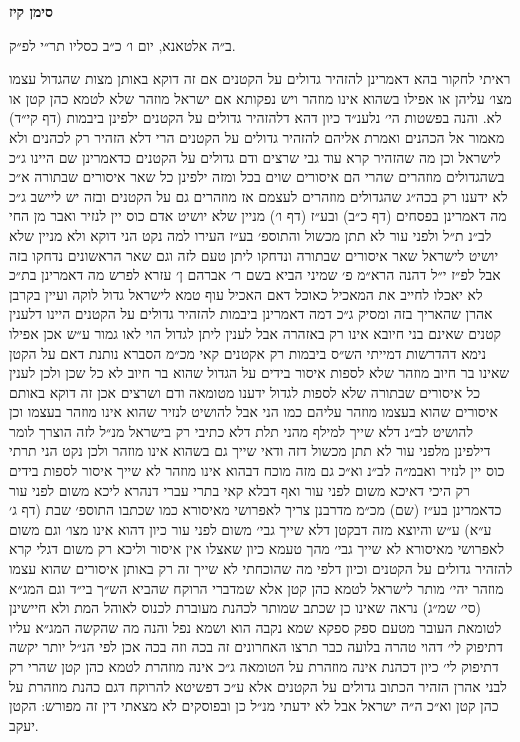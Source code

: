\documentclass[12pt, openany]{book}
\newcommand{\chapname}{}
\newcommand{\newchap}[1]{
	\addcontentsline{toc}{chapter}{#1}
	\renewcommand{\chapname}{#1}
		\begin{center}
			\textbf{%
\fontsize{16pt}{16pt}\selectfont
				#1}
		\end{center}
}
\begin{document}
\newchap{סימן קיז}
\begin{multicols}{2}
ב״ה אלטאנא, יום ו׳ כ״ב כסליו תר״י לפ״ק.\\\vspace{0pt}

ראיתי לחקור בהא דאמרינן להזהיר גדולים על הקטנים אם זה דוקא באותן מצות שהגדול עצמו מצו׳ עליהן או אפילו בשהוא אינו מוזהר ויש נפקותא אם ישראל מוזהר שלא לטמא כהן קטן או לא. והנה בפשטות הי׳ נלענ״ד כיון דהא דלהזהיר גדולים על הקטנים ילפינן ביבמות (דף קי״ד) מאמור אל הכהנים ואמרת אליהם להזהיר גדולים על הקטנים הרי דלא הזהיר רק לכהנים ולא לישראל וכן מה שהזהיר קרא עוד גבי שרצים ודם גדולים על הקטנים כדאמרינן שם היינו ג״כ בשהגדולים מוזהרים שהרי הם איסורים שוים בכל ומזה ילפינן כל שאר איסורים שבתורה א״כ לא ידענו רק בכה״ג שהגדולים מוזהרים לעצמם אז מוזהרים גם על הקטנים ובזה יש ליישב ג״כ מה דאמרינן בפסחים (דף כ״ב) ובע״ז (דף ו׳) מניין שלא יושיט אדם כוס יין לנזיר ואבר מן החי לב״נ ת״ל ולפני עור לא תתן מכשול והתוספ׳ בע״ז העירו למה נקט הני דוקא ולא מניין שלא יושיט לישראל שאר איסורים שבתורה ונדחקו ליתן טעם לזה וגם שאר הראשונים נדחקו בזה אבל לפ״ז י״ל דהנה הרא״מ פ׳ שמיני הביא בשם ר׳ אברהם ן׳ עזרא לפרש מה דאמרינן בת״כ לא יאכלו לחייב את המאכיל כאוכל דאם האכיל עוף טמא לישראל גדול לוקה ועיין בקרבן אהרן שהאריך בזה ומסיק ג״כ דמה דאמרינן ביבמות להזהיר גדולים על הקטנים היינו דלענין קטנים שאינם בני חיובא אינו רק באזהרה אבל לענין ליתן לגדול הוי לאו גמור ע״ש אכן אפילו נימא דהדרשות דמייתי הש״ס ביבמות רק אקטנים קאי מכ״מ הסברא נותנת דאם על הקטן שאינו בר חיוב מוזהר שלא לספות איסור בידים על הגדול שהוא בר חיוב לא כל שכן ולכן לענין כל איסורים שבתורה שלא לספות לגדול ידענו מטומאה ודם ושרצים אכן זה דוקא באותם איסורים שהוא בעצמו מוזהר עליהם כמו הני אבל להושיט לנזיר שהוא אינו מוזהר בעצמו וכן להושיט לב״נ דלא שייך למילף מהני תלת דלא כתיבי רק בישראל מנ״ל לזה הוצרך לומר דילפינן מלפני עור לא תתן מכשול דזה ודאי שייך גם בשהוא אינו מוזהר ולכן נקט הני תרתי כוס יין לנזיר ואבמ״ה לב״נ וא״כ גם מזה מוכח דבהוא אינו מוזהר לא שייך איסור לספות בידים רק היכי דאיכא משום לפני עור ואף דבלא קאי בתרי עברי דנהרא ליכא משום לפני עור כדאמרינן בע״ז (שם) מכ״מ מדרבנן צריך לאפרושי מאיסורא כמו שכתבו התוספ׳ שבת (דף ג׳ ע״א) ע״ש והיוצא מזה דבקטן דלא שייך גבי׳ משום לפני עור כיון דהוא אינו מצו׳ וגם משום לאפרושי מאיסורא לא שייך גבי׳ מהך טעמא כיון שאצלו אין איסור וליכא רק משום דגלי קרא להזהיר גדולים על הקטנים וכיון דלפי מה שהוכחתי לא שייך זה רק באותן איסורים שהוא עצמו מוזהר יהי׳ מותר לישראל לטמא כהן קטן אלא שמדברי הרוקח שהביא הש״ך בי״ד וגם המג״א (סי׳ שמ״ג) נראה שאינו כן שכתב שמותר לכהנת מעוברת לכנוס לאוהל המת ולא חיישינן לטומאת העובר מטעם ספק ספקא שמא נקבה הוא ושמא נפל והנה מה שהקשה המג״א עליו דתיפוק לי׳ דהוי טהרה בלועה כבר תרצו האחרונים זה בכה וזה בכה אכן לפי הנ״ל יותר יקשה דתיפוק לי׳ כיון דכהנת אינה מוזהרת על הטומאה ג״כ אינה מוזהרת לטמא כהן קטן שהרי רק לבני אהרן הזהיר הכתוב גדולים על הקטנים אלא ע״כ דפשיטא להרוקח דגם כהנת מוזהרת על כהן קטן וא״כ ה״ה ישראל אבל לא ידעתי מנ״ל כן ובפוסקים לא מצאתי דין זה מפורש: הקטן יעקב.\\\vspace{0pt}

\end{multicols}\newpage
\end{document}
